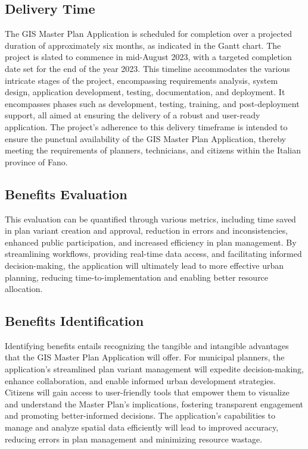 \subsection{Delivery Time}\label{subsec:delivery-time}
The GIS Master Plan Application is scheduled for completion over a projected duration of approximately six months, as indicated in the Gantt chart.
The project is slated to commence in mid-August 2023, with a targeted completion date set for the end of the year 2023.
This timeline accommodates the various intricate stages of the project, encompassing requirements analysis, system design, application development, testing, documentation, and deployment.
It encompasses phases such as development, testing, training, and post-deployment support, all aimed at ensuring the delivery of a robust and user-ready application.
The project's adherence to this delivery timeframe is intended to ensure the punctual availability of the GIS Master Plan Application, thereby meeting the requirements of planners, technicians, and citizens within the Italian province of Fano.

\subsection{Benefits Evaluation}\label{subsec:benefits-evaluation}
This evaluation can be quantified through various metrics, including time saved in plan variant creation and approval, reduction in errors and inconsistencies, enhanced public participation, and increased efficiency in plan management. 
By streamlining workflows, providing real-time data access, and facilitating informed decision-making, the application will ultimately lead to more effective urban planning, reducing time-to-implementation and enabling better resource allocation.

\subsection{Benefits Identification}\label{subsec:benefits-identification}
Identifying benefits entails recognizing the tangible and intangible advantages that the GIS Master Plan Application will offer. For municipal planners, the application's streamlined plan variant management will expedite decision-making, enhance collaboration, and enable informed urban development strategies. Citizens will gain access to user-friendly tools that empower them to visualize and understand the Master Plan's implications, fostering transparent engagement and promoting better-informed decisions.
The application's capabilities to manage and analyze spatial data efficiently will lead to improved accuracy, reducing errors in plan management and minimizing resource wastage.


